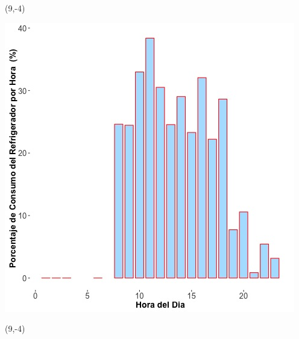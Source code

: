 \documentclass{article}\usepackage[]{graphicx}\usepackage[]{color}
\newenvironment{knitrout}{}{} %
\begin{document}
 \begin{textblock}{1}(9,-4)
\begin{minipage}{20em}
\begingroup

\endgroup
\end{minipage}
\end{textblock}

 \vspace{2cm}

\begin{knitrout}
\color{fgcolor}
\includegraphics[scale=0.65]{figure/A24_fridge_energy_pct.jpg} 
\end{knitrout}

 \begin{textblock}{1}(9,-4)
\begin{minipage}{20em}
\begingroup

\endgroup
\end{minipage}
\end{textblock}
\end{document}
